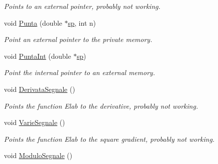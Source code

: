 \begin{DoxyCompactItemize}
\begin{DoxyCompactList}\small\item\em Points to an external pointer, probably not working. \end{DoxyCompactList}\item 
void \hyperlink{classVarDatFile_a3459dd82527a16fe552b58f9bbb3beca}{Punta} (double $\ast$\hyperlink{classVarDatFile_a0e376f4d59c4a98b04daf57047cad5f9}{sp}, int n)\hypertarget{classVarDatFile_a3459dd82527a16fe552b58f9bbb3beca}{}\label{classVarDatFile_a3459dd82527a16fe552b58f9bbb3beca}

\begin{DoxyCompactList}\small\item\em Point an external pointer to the private memory. \end{DoxyCompactList}\item 
void \hyperlink{classVarDatFile_ad4ea52d09ccc5d7b38b2952c4fdaa1a6}{Punta\+Int} (double $\ast$\hyperlink{classVarDatFile_a0e376f4d59c4a98b04daf57047cad5f9}{sp})\hypertarget{classVarDatFile_ad4ea52d09ccc5d7b38b2952c4fdaa1a6}{}\label{classVarDatFile_ad4ea52d09ccc5d7b38b2952c4fdaa1a6}

\begin{DoxyCompactList}\small\item\em Point the internal pointer to an external memory. \end{DoxyCompactList}\item 
void \hyperlink{classVarDatFile_a5a90e3f39948e4e3e870c9d83af5eef0}{Derivata\+Segnale} ()\hypertarget{classVarDatFile_a5a90e3f39948e4e3e870c9d83af5eef0}{}\label{classVarDatFile_a5a90e3f39948e4e3e870c9d83af5eef0}

\begin{DoxyCompactList}\small\item\em Points the function Elab to the derivative, probably not working. \end{DoxyCompactList}\item 
void \hyperlink{classVarDatFile_af79a8603c9c35b3f0b3018090697fca8}{Varie\+Segnale} ()\hypertarget{classVarDatFile_af79a8603c9c35b3f0b3018090697fca8}{}\label{classVarDatFile_af79a8603c9c35b3f0b3018090697fca8}

\begin{DoxyCompactList}\small\item\em Points the function Elab to the square gradient, probably not working. \end{DoxyCompactList}\item 
void \hyperlink{classVarDatFile_a72776345635c4c0717fce1b11f03d625}{Modulo\+Segnale} ()\hypertarget{classVarDatFile_a72776345635c4c0717fce1b11f03d625}{}\label{classVarDatFile_a72776345635c4c0717fce1b11f03d625}


\end{DoxyCompactItemize}
